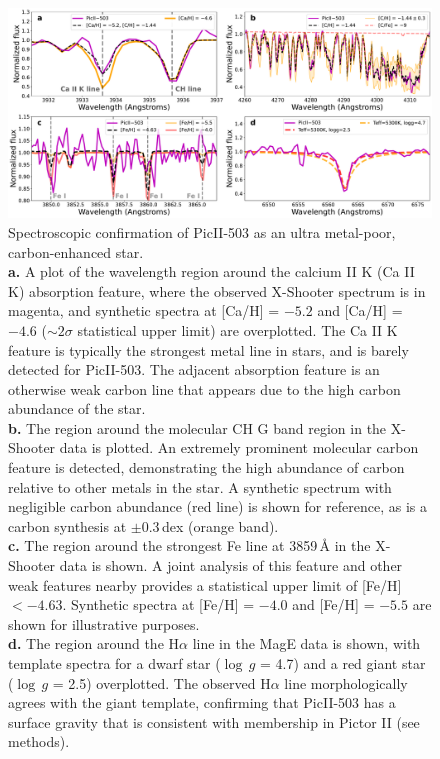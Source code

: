 \documentclass[pdflatex,sn-nature]{sn-jnl}%
\theoremstyle{thmstyleone}%
\theoremstyle{thmstyletwo}%
\theoremstyle{thmstylethree}%
\begin{document}
\begin{figure}[h]
\centering
\includegraphics[width=1.0\textwidth]{f2.pdf}
\caption{Spectroscopic confirmation of PicII-503 as an ultra metal-poor, carbon-enhanced star.\\
\textbf{a.} A plot of the wavelength region around the calcium II K (Ca II K) absorption feature, where the observed X-Shooter spectrum is in magenta, and synthetic spectra at [Ca/H] = $-5.2$ and [Ca/H] = $-4.6$ ($\sim2\sigma$ statistical upper limit) are overplotted. 
The Ca II K feature is typically the strongest metal line in stars, and is barely detected for PicII-503.
The adjacent absorption feature is an otherwise weak carbon line that appears due to the high carbon abundance of the star.\\
\textbf{b.} The region around the molecular CH G band region in the X-Shooter data is plotted. 
An extremely prominent molecular carbon feature is detected, demonstrating the high abundance of carbon relative to other metals in the star.
A synthetic spectrum with negligible carbon abundance (red line) is shown for reference, as is a carbon synthesis at $\pm0.3$\,dex (orange band).\\
\textbf{c.} The region around the strongest Fe line at 3859\,{\AA} in the X-Shooter data is shown. A joint analysis of this feature and other weak features nearby provides a statistical upper limit of [Fe/H] $< -4.63$. 
Synthetic spectra at [Fe/H] = $-4.0$ and [Fe/H] = $-5.5$ are shown for illustrative purposes.\\
\textbf{d.} The region around the H$\alpha$ line in the MagE data is shown, with template spectra for a dwarf star ($\log\,g$ = 4.7) and a red giant star ($\log\,g$ = 2.5) overplotted. 
The observed H$\alpha$ line morphologically agrees with the giant template, confirming that PicII-503 has a surface gravity that is consistent with membership in Pictor II (see methods).
}
\label{fig:spectra}
\end{figure}
\end{document}
